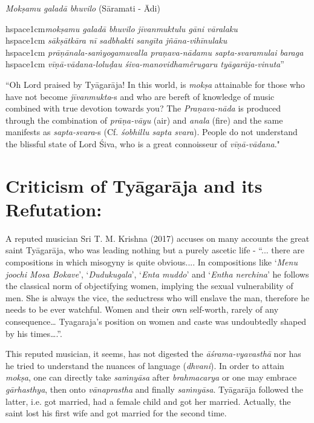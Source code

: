 \textit{Mokṣamu galadā bhuvilo} (Sāramati - Ādi)

\begin{myquote}
hspace{1cm}\textit{mokṣamu galadā bhuvilo jīvanmuktulu gāni vāralaku}\\hspace{1cm} \textit{sākṣātkāra nī sadbhakti sangīta jñāna-vihīnulaku}\\hspace{1cm} \textit{prāṇānala-saṁyogamuvalla praṇava-nādamu sapta-svaramulai baraga}\\hspace{1cm} \textit{vīṇā-vādana-loluḍau śiva-manovidhamêrugaru tyāgarāja-vinuta}”
\end{myquote}

``Oh Lord praised by Tyāgarāja! In this world, is \textit{mokṣa} attainable for those who have not become \textit{jīvanmukta}-s and who are bereft of knowledge of music combined with true devotion towards you? The \textit{Praṇava-nāda} is produced through the combination of \textit{prāṇa-vāyu} (air) and \textit{anala} (fire) and the same manifests as \textit{sapta-svara}-s (Cf. \textit{śobhillu sapta svara}). People do not understand the blissful state of Lord Śiva, who is a great connoisseur of \textit{vīṇā-vādana}."


\section*{Criticism of Tyāgarāja and its Refutation:}

A reputed musician Sri T. M. Krishna (2017) accuses on many accounts the great saint Tyāgarāja, who was leading nothing but a purely ascetic life - “... there are compositions in which misogyny is quite obvious.... In compositions like ‘\textit{Menu joochi Mosa Bokave}’, ‘\textit{Dudukugala}’, ‘\textit{Enta muddo}’ and ‘\textit{Entha nerchina}’ he follows the classical norm of objectifying women, implying the sexual vulnerability of men. She is always the vice, the seductress who will enslave the man, therefore he needs to be ever watchful. Women and their own self-worth, rarely of any consequence… Tyagaraja’s position on women and caste was undoubtedly shaped by his times….”.

This reputed musician, it seems, has not digested the \textit{āśrama-vyavasthā} nor has he tried to understand the nuances of language (\textit{dhvani}). In order to attain \textit{mokṣa}, one can directly take \textit{saṁnyāsa} after \textit{brahmacarya} or one may embrace \textit{gārhasthya}, then onto \textit{vānaprastha} and finally \textit{saṁnyāsa}. Tyāgarāja followed the latter, i.e. got married, had a female child and got her married. Actually, the saint lost his first wife and got married for the second time.

